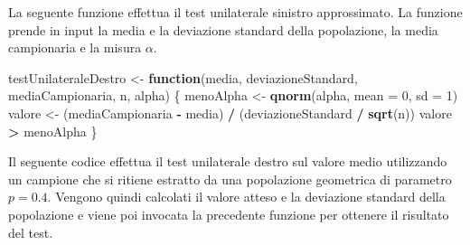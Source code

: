 \documentclass[]{book}
\newenvironment{Shaded}{\begin{snugshade}}{\end{snugshade}}
\newcommand{\KeywordTok}[1]{\textcolor[rgb]{0.13,0.29,0.53}{\textbf{#1}}}
\newcommand{\DataTypeTok}[1]{\textcolor[rgb]{0.13,0.29,0.53}{#1}}
\newcommand{\DecValTok}[1]{\textcolor[rgb]{0.00,0.00,0.81}{#1}}
\newcommand{\StringTok}[1]{\textcolor[rgb]{0.31,0.60,0.02}{#1}}
\newcommand{\ControlFlowTok}[1]{\textcolor[rgb]{0.13,0.29,0.53}{\textbf{#1}}}
\newcommand{\OperatorTok}[1]{\textcolor[rgb]{0.81,0.36,0.00}{\textbf{#1}}}
\newcommand{\NormalTok}[1]{#1}
\begin{document}
La seguente funzione effettua il test unilaterale sinistro approssimato.
La funzione prende in input la media e la deviazione standard della
popolazione, la media campionaria e la misura \(\alpha\).

\begin{Shaded}
\begin{Highlighting}[]
\NormalTok{testUnilateraleDestro <-}\StringTok{ }\ControlFlowTok{function}\NormalTok{(media, deviazioneStandard, mediaCampionaria, n, alpha) \{}
\NormalTok{  menoAlpha <-}\StringTok{ }\KeywordTok{qnorm}\NormalTok{(alpha, }\DataTypeTok{mean =} \DecValTok{0}\NormalTok{, }\DataTypeTok{sd =} \DecValTok{1}\NormalTok{)}
\NormalTok{  valore <-}\StringTok{ }\NormalTok{(mediaCampionaria }\OperatorTok{-}\StringTok{ }\NormalTok{media) }\OperatorTok{/}\StringTok{ }\NormalTok{(deviazioneStandard }\OperatorTok{/}\StringTok{ }\KeywordTok{sqrt}\NormalTok{(n))}
\NormalTok{  valore }\OperatorTok{>}\StringTok{ }\NormalTok{menoAlpha}
\NormalTok{\}}
\end{Highlighting}
\end{Shaded}

Il seguente codice effettua il test unilaterale destro sul valore medio
utilizzando un campione che si ritiene estratto da una popolazione
geometrica di parametro \(p = 0.4\). Vengono quindi calcolati il valore
atteso e la deviazione standard della popolazione e viene poi invocata
la precedente funzione per ottenere il risultato del test.
\end{document}
